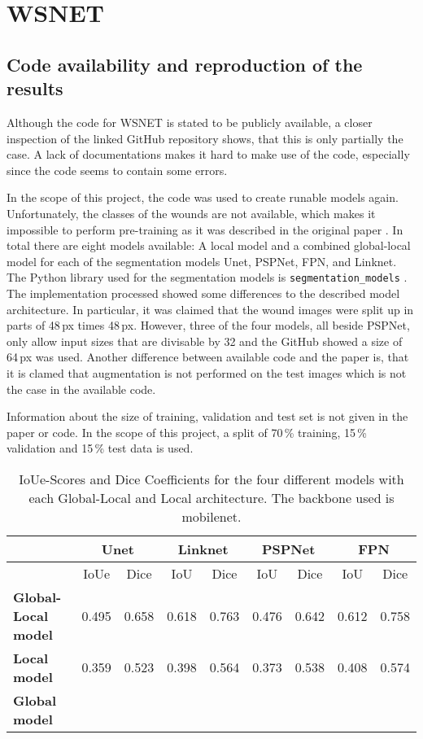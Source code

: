 \section{WSNET}

\subsection{Code availability and reproduction of the results}

Although the code for WSNET \cite{Oota_2023_WACV} is stated to be publicly available, a closer inspection of the linked GitHub repository shows, that this is only partially the case. A lack of documentations makes it hard to make use of the code, especially since the code seems to contain some errors.

In the scope of this project, the code was used to create runable models again. Unfortunately, the classes of the wounds are not available, which makes it impossible to perform pre-training as it was described in the original paper \cite{Oota_2023_WACV}. In total there are eight models available: A local model and a combined global-local model for each of the segmentation models Unet, PSPNet, FPN, and Linknet. The Python library used for the segmentation models is \texttt{segmentation\_models} \cite{SegmentationModels}. The implementation processed showed some differences to the described model architecture. In particular, it was claimed that the wound images were split up in parts of 48\,px times 48\,px. However, three of the four models, all beside PSPNet, only allow input sizes that are divisable by 32 and the GitHub showed a size of 64\,px was used. Another difference between available code and the paper is, that it is clamed that augmentation is not performed on the test images which is not the case in the available code.

Information about the size of training, validation and test set is not given in the paper or code. In the scope of this project, a split of 70\,\% training, 15\,\% validation and 15\,\% test data is used. 


\begin{table}[htb!]
	\begin{tabular}{l||c | c | c | c | c | c | c | c|}
	& \multicolumn{2}{|c|}{Unet} & \multicolumn{2}{|c|}{Linknet} & \multicolumn{2}{|c|}{PSPNet} & \multicolumn{2}{|c|}{FPN} \\
	\hline
	& IoUe & Dice & IoU & Dice & IoU & Dice & IoU & Dice \\
	\hline\hline
	\textbf{Global-Local model} & 0.495 & 0.658 & 0.618 & 0.763 & 0.476 & 0.642 & 0.612 & 0.758\\
	\textbf{Local model} & 0.359 & 0.523 & 0.398 & 0.564 & 0.373 & 0.538 & 0.408 & 0.574 \\	
	\textbf{Global model} & \\
	\end{tabular}
	\caption{IoUe-Scores and Dice Coefficients for the four different models with each Global-Local and Local architecture. The backbone used is mobilenet.}
\end{table}
